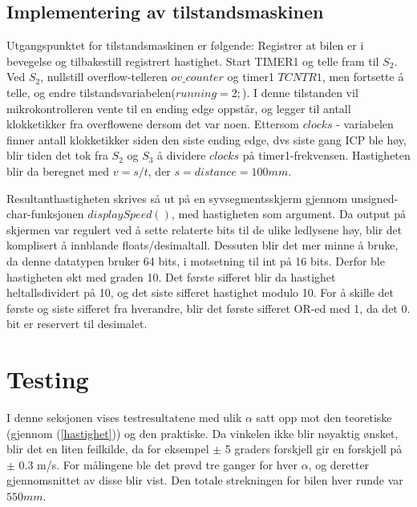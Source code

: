 \documentclass[11pt, a4paper]{report}
\begin{document}
\subsection{Implementering av tilstandsmaskinen}
Utgangspunktet for tilstandsmaskinen er følgende: Registrer at bilen er i bevegelse og tilbakestill registrert hastighet. Start TIMER1 og telle fram til $S_{2}$. Ved $S_{2}$, nullstill overflow-telleren $ov\_counter$ og timer1 $TCNTR1$, men fortsette å telle, og endre tilstandsvariabelen($running = 2;$). I denne tilstanden vil mikrokontrolleren vente til en ending edge oppstår, og legger til antall klokketikker fra overflowene dersom det var noen. Ettersom $clocks$ - variabelen finner antall klokketikker siden den siste ending edge, dvs siste gang ICP ble høy, blir tiden det tok fra $S_{2}$ og $S_{3}$ å dividere $clocks$ på timer1-frekvensen. Hastigheten blir da beregnet med $v = s/t$, der $ s = distance = 100mm$.\newline

Resultanthastigheten skrives så ut på en syvsegmentsskjerm gjennom unsigned-char-funksjonen \newline $displaySpeed()$, med hastigheten som argument. Da output på skjermen var regulert ved å sette relaterte bits til de ulike ledlysene høy, blir det komplisert å innblande floats/desimaltall. Dessuten blir det mer minne å bruke, da denne datatypen bruker 64 bits, i motsetning til int på 16 bits. Derfor ble hastigheten økt med graden 10. Det første sifferet blir da hastighet heltallsdividert på 10, og det siste sifferet hastighet modulo 10. For å skille det første og siste sifferet fra hverandre, blir det første sifferet OR-ed med 1, da det 0. bit er reservert til desimalet. 


\section{Testing}
I denne seksjonen vises testresultatene med ulik $\alpha$ satt opp mot den teoretiske (gjennom (\ref{hastighet})) og den praktiske. Da vinkelen ikke blir nøyaktig ønsket, blir det en liten feilkilde, da for eksempel $\pm$ 5 graders forskjell gir en forskjell på $\pm$ 0.3 m/s. For målingene ble det prøvd tre ganger for hver $\alpha$, og deretter gjennomsnittet av disse blir vist. Den totale strekningen for bilen hver runde var $550mm$.
\end{document}
